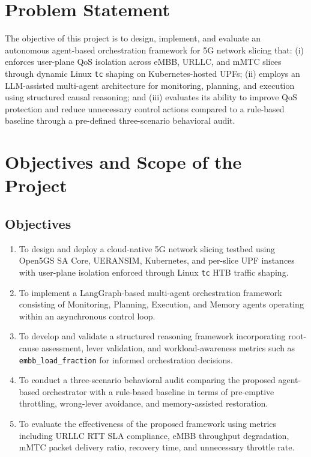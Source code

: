 \section{Problem Statement}

The objective of this project is to design, implement, and evaluate an autonomous agent-based orchestration framework for 5G network slicing that: (i) enforces user-plane QoS isolation across eMBB, URLLC, and mMTC slices through dynamic Linux \texttt{tc} shaping on Kubernetes-hosted UPFs; (ii) employs an LLM-assisted multi-agent architecture for monitoring, planning, and execution using structured causal reasoning; and (iii) evaluates its ability to improve QoS protection and reduce unnecessary control actions compared to a rule-based baseline through a pre-defined three-scenario behavioral audit.

\section{Objectives and Scope of the Project}

\subsection{Objectives}

\begin{enumerate}[leftmargin=*]
  \item To design and deploy a cloud-native 5G network slicing testbed using Open5GS SA Core, UERANSIM, Kubernetes, and per-slice UPF instances with user-plane isolation enforced through Linux \texttt{tc} HTB traffic shaping.

  \item To implement a LangGraph-based multi-agent orchestration framework consisting of Monitoring, Planning, Execution, and Memory agents operating within an asynchronous control loop.

  \item To develop and validate a structured reasoning framework incorporating root-cause assessment, lever validation, and workload-awareness metrics such as \texttt{embb\_load\_fraction} for informed orchestration decisions.

  \item To conduct a three-scenario behavioral audit comparing the proposed agent-based orchestrator with a rule-based baseline in terms of pre-emptive throttling, wrong-lever avoidance, and memory-assisted restoration.

  \item To evaluate the effectiveness of the proposed framework using metrics including URLLC RTT SLA compliance, eMBB throughput degradation, mMTC packet delivery ratio, recovery time, and unnecessary throttle rate.
\end{enumerate}

